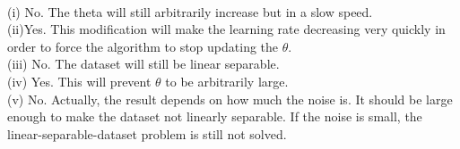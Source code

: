 \begin{answer}\\
(i) No. The theta will still arbitrarily increase but in a slow speed.\\
(ii)Yes. This modification will make the learning rate decreasing very quickly in order to force the algorithm to stop updating the $\theta$.\\
(iii) No. The dataset will still be linear separable.\\
(iv) Yes. This will prevent $\theta$ to be arbitrarily large.\\
(v) No. Actually, the result depends on how much the noise is. It should be large enough to make the dataset not linearly separable. If the noise is small, the linear-separable-dataset problem is still not solved.
\end{answer}
